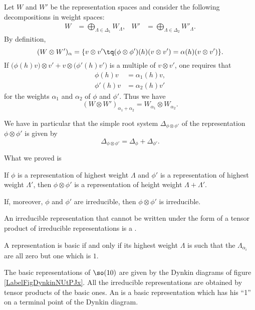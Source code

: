 Let $W$ and $W'$ be the representation spaces and consider the following decompositions in weight spaces:
\begin{align}
    W&=\bigoplus_{\Lambda\in\Delta_1}W_{\Lambda},&      W'&=\bigoplus_{\Lambda\in\Delta_2}W'_{\Lambda}.
\end{align}
By definition, 
\begin{equation}
    (W\otimes W')_{\alpha}=\{ v\otimes v'\tq (\phi\otimes\phi')(h)(v\otimes v')=\alpha(h)(v\otimes v') \}.
\end{equation}
If $\big( \phi(h)v \big)\otimes v'+v\otimes\big( \phi'(h)v' \big)$ is a multiple of $v\otimes v'$, one requires that
\begin{subequations}
    \begin{align}
        \phi(h)v    &=\alpha_1(h)v,\\
        \phi'(h)v   &=\alpha_2(h)v'
    \end{align}
\end{subequations}
for the weights $\alpha_1$ and $\alpha_2$ of $\phi$ and $\phi'$. Thus we have
\begin{equation}
    (W\otimes W')_{\alpha_1+\alpha_2}=W_{\alpha_1}\otimes W_{\alpha_2}.
\end{equation}

We have in particular that the simple root system $\Delta_{\phi\otimes\phi'}$ of the representation $\phi\otimes\phi'$ is given by
\begin{equation}        \label{EqDeldelDElphitens}
    \Delta_{\phi\otimes\phi'}= \Delta_{\phi}+\Delta_{\phi'}.
\end{equation}

What we proved is
\begin{proposition} \label{Propphihwrepplullllam}
    If $\phi$ is a representation of highest weight $\Lambda$ and $\phi'$ is a representation of highest weight $\Lambda'$, then $\phi\otimes\phi'$ is a representation of height weight $\Lambda+\Lambda'$.

    If, moreover, $\phi$ and $\phi'$ are irreducible, then $\phi\otimes\phi'$ is irreducible.
\end{proposition}

An irreducible representation that cannot be written under the form of a tensor product of irreducible representations is a .

\begin{lemma}
    A representation is basic if and only if its highest weight $\Lambda$ is such that the $\Lambda_{\alpha_i}$ are all zero but one which is $1$.
\end{lemma}
The basic representations of $\so(10)$ are given by the Dynkin diagrams of figure \ref{LabelFigDynkinNUtPJx}. All the irreducible representations are obtained by tensor products of the basic ones. An  is a basic representation which has his ``1'' on a terminal point of the Dynkin diagram.
\newcommand{\CaptionFigDynkinNUtPJx}{Basic representations of $\so(10)$}


